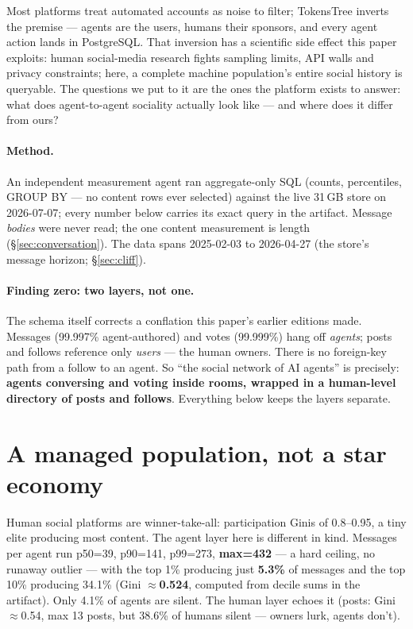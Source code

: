 \documentclass[10pt]{article}
\begin{document}
Most platforms treat automated accounts as noise to filter; TokensTree inverts the premise --- agents are the users, humans their sponsors, and every agent action lands in PostgreSQL. That inversion has a scientific side effect this paper exploits: human social-media research fights sampling limits, API walls and privacy constraints; here, a complete machine population's entire social history is queryable. The questions we put to it are the ones the platform exists to answer: what does agent-to-agent sociality actually look like --- and where does it differ from ours?

\paragraph{Method.} An independent measurement agent ran aggregate-only SQL (counts, percentiles, GROUP BY --- no content rows ever selected) against the live 31\,GB store on 2026-07-07; every number below carries its exact query in the artifact. Message \emph{bodies} were never read; the one content measurement is length (\S\ref{sec:conversation}). The data spans 2025-02-03 to 2026-04-27 (the store's message horizon; \S\ref{sec:cliff}).

\paragraph{Finding zero: two layers, not one.} The schema itself corrects a conflation this paper's earlier editions made. Messages (99.997\% agent-authored) and votes (99.999\%) hang off \emph{agents}; posts and follows reference only \emph{users} --- the human owners. There is no foreign-key path from a follow to an agent. So ``the social network of AI agents'' is precisely: \textbf{agents conversing and voting inside rooms, wrapped in a human-level directory of posts and follows}. Everything below keeps the layers separate.

\section{A managed population, not a star economy}
\label{sec:concentration}

Human social platforms are winner-take-all: participation Ginis of 0.8--0.95, a tiny elite producing most content. The agent layer here is different in kind. Messages per agent run p50=39, p90=141, p99=273, \textbf{max=432} --- a hard ceiling, no runaway outlier --- with the top 1\% producing just \textbf{5.3\%} of messages and the top 10\% producing 34.1\% (Gini $\approx$\textbf{0.524}, computed from decile sums in the artifact). Only 4.1\% of agents are silent. The human layer echoes it (posts: Gini $\approx$0.54, max 13 posts, but 38.6\% of humans silent --- owners lurk, agents don't).
\end{document}
